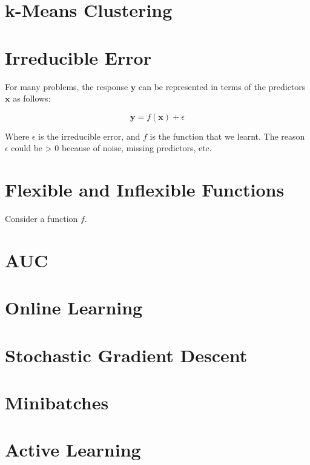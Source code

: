 \documentclass{article}
\newcommand\mbf{\mathbf}
\begin{document}
\section{k-Means Clustering}

\section{Irreducible Error}
For many problems, the response $\mbf y$ can be represented in terms of the predictors $\mbf x$ as follows:

\begin{equation}
\mbf{y} = f(\mbf{x}) + \epsilon
\end{equation}

Where $\epsilon$ is the irreducible error, and $f$ is the function that we learnt. The reason $\epsilon$ could be > 0 because of noise, missing predictors, etc.

\section{Flexible and Inflexible Functions}
Consider a function $f$.

\section{AUC}

\section{Online Learning}

\section{Stochastic Gradient Descent}

\section{Minibatches}

\section{Active Learning}



\end{document}
